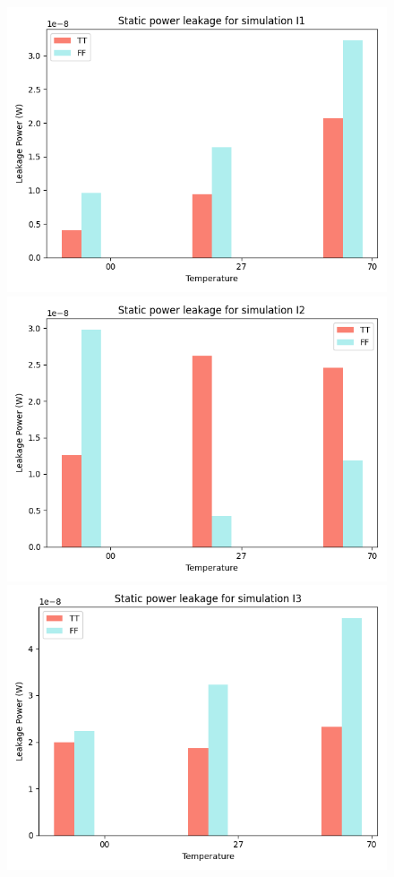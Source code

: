\begin{figure}[H]
    \centering
    \includegraphics[height= 0.21\textheight]{figures/aimspice/0.600_0.1u_0.1u_0.300u_0.1u/leakage_data/leakage_power_I05.png}
    \vspace{5pt}
    \includegraphics[height= 0.21\textheight]{figures/aimspice/0.600_0.1u_0.1u_0.300u_0.1u/leakage_data/leakage_power_I07.png}
    \vspace{5pt}
    \includegraphics[height= 0.21\textheight]{figures/aimspice/0.600_0.1u_0.1u_0.300u_0.1u/leakage_data/leakage_power_I09.png}

\end{figure}

